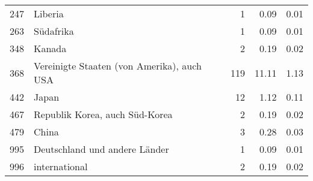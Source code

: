 \begin{longtable}{lXrrr}
        247 & \multicolumn{1}{X}{Liberia} & %
          \num{1} &
          \num[round-mode=places,round-precision=2]{0.09} &
          \num[round-mode=places,round-precision=2]{0.01} \\

        263 & \multicolumn{1}{X}{Südafrika} & %
          \num{1} &
          \num[round-mode=places,round-precision=2]{0.09} &
          \num[round-mode=places,round-precision=2]{0.01} \\

        348 & \multicolumn{1}{X}{Kanada} & %
          \num{2} &
          \num[round-mode=places,round-precision=2]{0.19} &
          \num[round-mode=places,round-precision=2]{0.02} \\

        368 & \multicolumn{1}{X}{Vereinigte Staaten (von Amerika), auch USA} & %
          \num{119} &
          \num[round-mode=places,round-precision=2]{11.11} &
          \num[round-mode=places,round-precision=2]{1.13} \\

        442 & \multicolumn{1}{X}{Japan} & %
          \num{12} &
          \num[round-mode=places,round-precision=2]{1.12} &
          \num[round-mode=places,round-precision=2]{0.11} \\

        467 & \multicolumn{1}{X}{Republik Korea, auch Süd-Korea} & %
          \num{2} &
          \num[round-mode=places,round-precision=2]{0.19} &
          \num[round-mode=places,round-precision=2]{0.02} \\

        479 & \multicolumn{1}{X}{China} & %
          \num{3} &
          \num[round-mode=places,round-precision=2]{0.28} &
          \num[round-mode=places,round-precision=2]{0.03} \\

        995 & \multicolumn{1}{X}{Deutschland und andere Länder} & %
          \num{1} &
          \num[round-mode=places,round-precision=2]{0.09} &
          \num[round-mode=places,round-precision=2]{0.01} \\

        996 & \multicolumn{1}{X}{international} & %
          \num{2} &
          \num[round-mode=places,round-precision=2]{0.19} &
          \num[round-mode=places,round-precision=2]{0.02} \\


\end{longtable}
